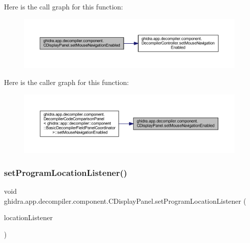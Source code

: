 Here is the call graph for this function\+:
\nopagebreak
\begin{figure}[H]
\begin{center}
\leavevmode
\includegraphics[width=350pt]{classghidra_1_1app_1_1decompiler_1_1component_1_1_c_display_panel_afe5766cd998ebfb262a39bdf7f5ce1c3_cgraph}
\end{center}
\end{figure}
Here is the caller graph for this function\+:
\nopagebreak
\begin{figure}[H]
\begin{center}
\leavevmode
\includegraphics[width=350pt]{classghidra_1_1app_1_1decompiler_1_1component_1_1_c_display_panel_afe5766cd998ebfb262a39bdf7f5ce1c3_icgraph}
\end{center}
\end{figure}
\mbox{\label{classghidra_1_1app_1_1decompiler_1_1component_1_1_c_display_panel_ace727d9df1d16bcf1514aee81db6b007}} 
\subsubsection{\texorpdfstring{setProgramLocationListener()}{setProgramLocationListener()}}
{\footnotesize\ttfamily void ghidra.\+app.\+decompiler.\+component.\+C\+Display\+Panel.\+set\+Program\+Location\+Listener (\begin{DoxyParamCaption}\item[{Program\+Location\+Listener}]{location\+Listener }\end{DoxyParamCaption})\hspace{0.3cm}{\ttfamily [inline]}}



